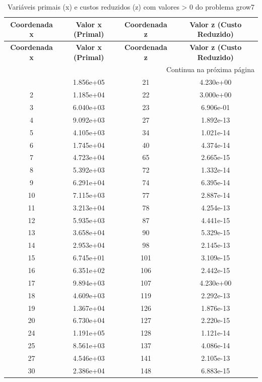 \documentclass[12pt]{article}
\begin{document}
\begin{longtable}{@{}cccc@{}}
\caption{Variáveis primais (x) e custos reduzidos (z) com valores > 0 do problema grow7} \\
\toprule
\textbf{Coordenada x} & \textbf{Valor x (Primal)} & \textbf{Coordenada z} & \textbf{Valor z (Custo Reduzido)} \\
\midrule
\endfirsthead

\toprule
\textbf{Coordenada x} & \textbf{Valor x (Primal)} & \textbf{Coordenada z} & \textbf{Valor z (Custo Reduzido)} \\
\midrule
\endhead

\midrule \multicolumn{4}{r}{{Continua na próxima página}} \\ \midrule
\endfoot

\bottomrule
\endlastfoot
1 & 1.856e+05 & 21 & 4.230e+00 \\
2 & 1.185e+04 & 22 & 3.000e+00 \\
3 & 6.040e+03 & 23 & 6.906e-01 \\
4 & 9.092e+03 & 27 & 1.892e-13 \\
5 & 4.105e+03 & 34 & 1.021e-14 \\
6 & 1.745e+04 & 40 & 4.374e-14 \\
7 & 4.723e+04 & 65 & 2.665e-15 \\
8 & 5.392e+03 & 72 & 1.332e-14 \\
9 & 6.291e+04 & 74 & 6.395e-14 \\
10 & 7.115e+03 & 77 & 2.887e-14 \\
11 & 3.213e+04 & 78 & 4.254e-13 \\
12 & 5.935e+03 & 87 & 4.441e-15 \\
13 & 3.658e+04 & 90 & 5.329e-15 \\
14 & 2.953e+04 & 98 & 2.145e-13 \\
15 & 6.745e+01 & 101 & 3.109e-15 \\
16 & 6.351e+02 & 106 & 2.442e-15 \\
17 & 9.894e+03 & 107 & 4.230e+00 \\
18 & 4.609e+03 & 119 & 2.292e-13 \\
19 & 1.367e+04 & 126 & 1.876e-13 \\
20 & 6.730e+04 & 127 & 2.220e-15 \\
24 & 1.191e+05 & 128 & 1.121e-14 \\
25 & 8.561e+03 & 137 & 4.086e-14 \\
27 & 4.546e+03 & 141 & 2.105e-13 \\
30 & 2.386e+04 & 148 & 6.883e-15 \\

\end{longtable}
\end{document}
